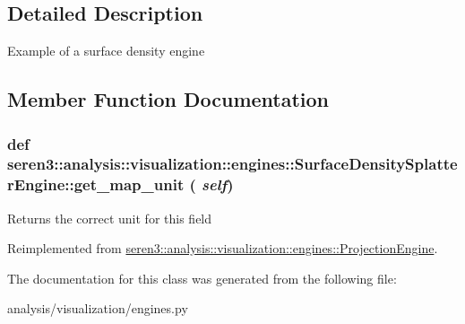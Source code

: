 \subsection{Detailed Description}
\begin{DoxyVerb}
Example of a surface density engine
\end{DoxyVerb}
 

\subsection{Member Function Documentation}
\hypertarget{classseren3_1_1analysis_1_1visualization_1_1engines_1_1SurfaceDensitySplatterEngine_ae2e4c1095a51c7cfeab0eebdcae10e37}{
\subsubsection[{get\_\-map\_\-unit}]{\setlength{\rightskip}{0pt plus 5cm}def seren3::analysis::visualization::engines::SurfaceDensitySplatterEngine::get\_\-map\_\-unit ( {\em self})}}
\label{classseren3_1_1analysis_1_1visualization_1_1engines_1_1SurfaceDensitySplatterEngine_ae2e4c1095a51c7cfeab0eebdcae10e37}
\begin{DoxyVerb}
Returns the correct unit for this field
\end{DoxyVerb}
 

Reimplemented from \hyperlink{classseren3_1_1analysis_1_1visualization_1_1engines_1_1ProjectionEngine_a2009db840c6f340e3c39d21dc81a3b77}{seren3::analysis::visualization::engines::ProjectionEngine}.

The documentation for this class was generated from the following file:\begin{DoxyCompactItemize}
\item 
analysis/visualization/engines.py\end{DoxyCompactItemize}

